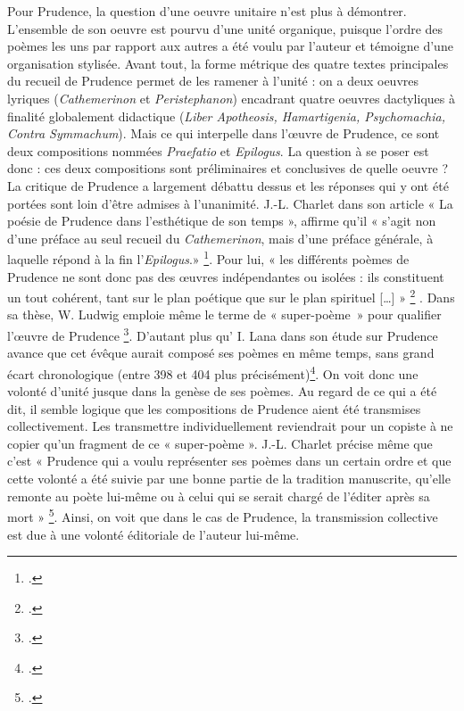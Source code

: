 \documentclass[a4paper,twoside,12pt]{book}
\begin{document}
Pour Prudence, la question d'une oeuvre unitaire n'est plus à démontrer. L'ensemble de son oeuvre est  pourvu d'une unité organique, puisque l'ordre des poèmes les uns par rapport aux autres a été voulu par l'auteur et témoigne d'une organisation stylisée. Avant tout, la forme métrique des quatre textes principales du recueil de Prudence permet de les ramener à l'unité : on a deux oeuvres lyriques (\textit{Cathemerinon} et \textit{Peristephanon}) encadrant quatre oeuvres dactyliques à finalité globalement didactique (\textit{Liber Apotheosis, Hamartigenia, Psychomachia, Contra Symmachum}). Mais ce qui interpelle dans l’œuvre de Prudence, ce sont deux compositions nommées \textit{Praefatio} et \textit{Epilogus}. La question à se poser est donc : ces deux compositions sont préliminaires et conclusives de quelle oeuvre ? La critique de Prudence a largement débattu dessus et les réponses qui y ont été portées sont loin d’être admises à l’unanimité.  J.-L. Charlet dans son article « La poésie de Prudence dans l'esthétique de son temps », affirme qu’il « s’agit non d’une préface au seul recueil du \textit{Cathemerinon}, mais d’une préface générale, à laquelle répond à la fin l’\textit{Epilogus}.» \footcite{Charlet}. Pour lui, « les différents poèmes de Prudence ne sont donc pas des œuvres indépendantes ou isolées : ils constituent un tout cohérent, tant sur le plan poétique que sur le plan spirituel […] » \footcite[p. 369]{Charlet} . Dans sa thèse, W. Ludwig emploie même le terme de « super-poème~» pour qualifier l’œuvre de Prudence \footcite{ludwig1977}. D’autant plus qu’ I. Lana dans son étude sur Prudence avance que cet évêque aurait composé ses poèmes en même temps, sans grand écart chronologique (entre 398 et 404 plus précisément)\footcite[24]{Lana}. On voit donc une volonté d’unité jusque dans la genèse de ses poèmes. Au regard de ce qui a été dit, il semble logique que les compositions de Prudence aient été transmises collectivement. Les transmettre individuellement reviendrait pour un copiste à ne  copier qu’un fragment de ce « super-poème ».  J.-L. Charlet précise même que c’est « Prudence qui a voulu représenter ses poèmes dans un certain ordre et que cette volonté a été suivie par une bonne partie de la tradition manuscrite, qu’elle remonte au poète lui-même ou à celui qui se serait chargé de l’éditer après sa mort » \footcite[p. 370]{Charlet}.  Ainsi, on voit que dans le cas de Prudence, la transmission collective est due à une volonté éditoriale de l’auteur lui-même.
\end{document}
